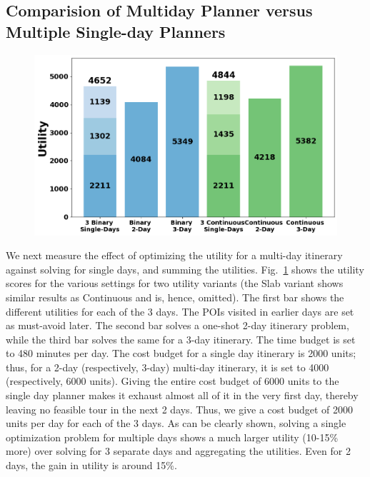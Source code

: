 \subsection{Comparision of Multiday  Planner versus Multiple Single-day  Planners}
\label{sec:exp multi-day}

\begin{figure}[t]
\centering
\includegraphics[width=\figwidth]{plots/multivssingle.png}
\label{fig:multi-day}
\end{figure}

We next measure the effect of optimizing the utility for a multi-day itinerary against solving for single days, and summing the utilities.
Fig.~\ref{fig:multi-day} shows the utility scores for the various settings for two utility variants (the Slab variant shows similar results as Continuous and is, hence, omitted).
The first bar shows the different utilities for each of the 3 days. The POIs visited in earlier days are set as must-avoid later.
The second bar solves a one-shot 2-day itinerary problem, while the third bar solves the same for a 3-day itinerary.
The time budget is set to 480 minutes per day.
The cost budget for a single day itinerary is 2000 units; thus, for a 2-day (respectively, 3-day) multi-day itinerary, it is set to 4000 (respectively, 6000 units).
Giving the entire cost budget of 6000 units to the single day planner makes it exhaust almost all of it in the very first day, thereby leaving no feasible tour in the next 2 days.
Thus, we give a cost budget of 2000 units per day for each of the 3 days.
As can be clearly shown, solving a single optimization problem for multiple days shows a much larger utility (10-15\% more) over solving for 3 separate days and aggregating the utilities.
Even for 2 days, the gain in utility is around 15\%.

